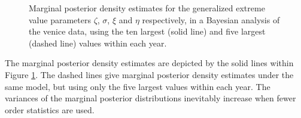 \documentclass[11pt,a4paper]{article}
\begin{document}
\begin{figure}
\begin{center}
   \vspace{-1.5cm}
  \hspace{-0.5cm} 
  \hspace{-0.5cm} 
  \hspace{-0.5cm} 
\end{center}
\caption{Marginal posterior density estimates for the generalized
  extreme value parameters $\zeta$, $\sigma$, $\xi$ and $\eta$
  respectively, in a Bayesian analysis of the venice data, using the
  ten largest (solid line) and five largest (dashed line) values
  within each year.}
\label{vendens}
\end{figure}

The marginal posterior density estimates are depicted by the solid
lines within Figure \ref{vendens}.  The dashed lines give marginal
posterior density estimates under the same model, but using only the
five largest values within each year.  The variances of the marginal
posterior distributions inevitably increase when fewer order
statistics are used.

\clearpage

\end{document}
